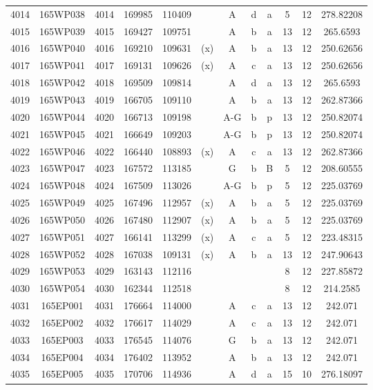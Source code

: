 \begin{tabular}{|*{12}{c|}}
4014 & 165WP038 & 4014 & 169985 & 110409 &  & A & d & a & 5 & 12 & 278.82208 \\ 
4015 & 165WP039 & 4015 & 169427 & 109751 &  & A & b & a & 13 & 12 & 265.6593 \\ 
4016 & 165WP040 & 4016 & 169210 & 109631 & (x) & A & b & a & 13 & 12 & 250.62656 \\ 
4017 & 165WP041 & 4017 & 169131 & 109626 & (x) & A & c & a & 13 & 12 & 250.62656 \\ 
4018 & 165WP042 & 4018 & 169509 & 109814 &  & A & d & a & 13 & 12 & 265.6593 \\ 
4019 & 165WP043 & 4019 & 166705 & 109110 &  & A & b & a & 13 & 12 & 262.87366 \\ 
4020 & 165WP044 & 4020 & 166713 & 109198 &  & A-G & b & p & 13 & 12 & 250.82074 \\ 
4021 & 165WP045 & 4021 & 166649 & 109203 &  & A-G & b & p & 13 & 12 & 250.82074 \\ 
4022 & 165WP046 & 4022 & 166440 & 108893 & (x) & A & c & a & 13 & 12 & 262.87366 \\ 
4023 & 165WP047 & 4023 & 167572 & 113185 &  & G & b & B & 5 & 12 & 208.60555 \\ 
4024 & 165WP048 & 4024 & 167509 & 113026 &  & A-G & b & p & 5 & 12 & 225.03769 \\ 
4025 & 165WP049 & 4025 & 167496 & 112957 & (x) & A & b & a & 5 & 12 & 225.03769 \\ 
4026 & 165WP050 & 4026 & 167480 & 112907 & (x) & A & b & a & 5 & 12 & 225.03769 \\ 
4027 & 165WP051 & 4027 & 166141 & 113299 & (x) & A & c & a & 5 & 12 & 223.48315 \\ 
4028 & 165WP052 & 4028 & 167038 & 109131 & (x) & A & b & a & 13 & 12 & 247.90643 \\ 
4029 & 165WP053 & 4029 & 163143 & 112116 &  &  &  &  & 8 & 12 & 227.85872 \\ 
4030 & 165WP054 & 4030 & 162344 & 112518 &  &  &  &  & 8 & 12 & 214.2585 \\ 
4031 & 165EP001 & 4031 & 176664 & 114000 &  & A & c & a & 13 & 12 & 242.071 \\ 
4032 & 165EP002 & 4032 & 176617 & 114029 &  & A & c & a & 13 & 12 & 242.071 \\ 
4033 & 165EP003 & 4033 & 176545 & 114076 &  & G & b & a & 13 & 12 & 242.071 \\ 
4034 & 165EP004 & 4034 & 176402 & 113952 &  & A & b & a & 13 & 12 & 242.071 \\ 
4035 & 165EP005 & 4035 & 170706 & 114936 &  & A & d & a & 15 & 10 & 276.18097 \\ 

\end{tabular}
